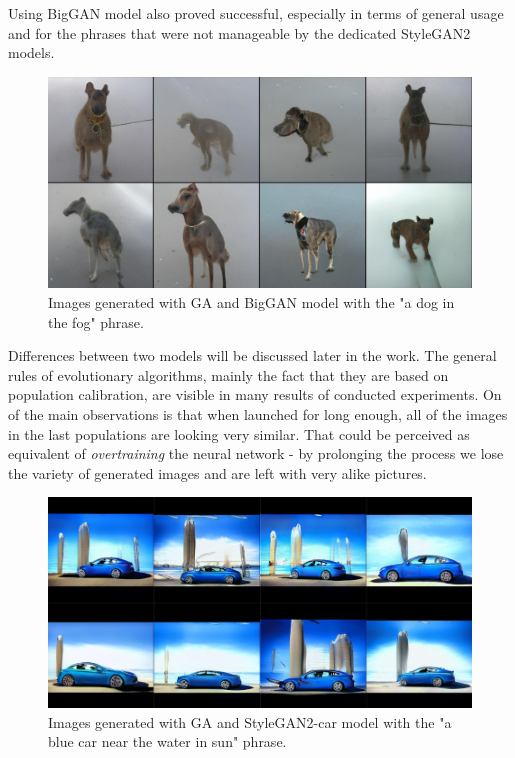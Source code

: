 \documentclass[12pt,a4paper,openany]{book}
\begin{document}
\noindent Using BigGAN model also proved successful, especially in terms of general usage and for the phrases that were not manageable by the dedicated StyleGAN2 models.

\begin{figure}[H]
    \centering
    \includegraphics[scale=0.55]{figs/doginthefog.png}
    \caption{Images generated with GA and BigGAN model with the "a dog in the fog" phrase.}\label{Fig:doginthefog}
\end{figure}

\noindent Differences between two models will be discussed later in the work.\newline
\noindent The general rules of evolutionary algorithms, mainly the fact that they are based on population calibration, are visible in many results of conducted experiments. On of the main observations is that when launched for long enough, all of the images in the last populations are looking very similar. That could be perceived as equivalent of \textit{overtraining} the neural network - by prolonging the process we lose the variety of generated images and are left with very alike pictures.

\begin{figure}[H]
    \centering
    \includegraphics[scale=0.6]{figs/bluecar.png}
    \caption{Images generated with GA and StyleGAN2-car model with the "a blue car near the water in sun" phrase.}\label{Fig:bluecar}
\end{figure}
\end{document}
